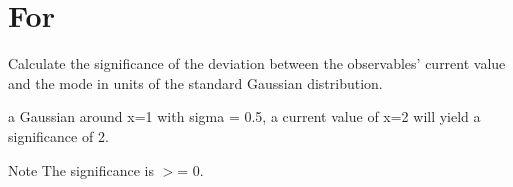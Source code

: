 \hypertarget{For-example}{
\section{For}
}
Calculate the significance of the deviation between the observables' current value and the mode in units of the standard Gaussian distribution.

a Gaussian around x=1 with sigma = 0.5, a current value of x=2 will yield a significance of 2.

\begin{DoxyNote}{Note}
The significance is $>$= 0.
\end{DoxyNote}

\begin{DoxyCodeInclude}
\end{DoxyCodeInclude}
 